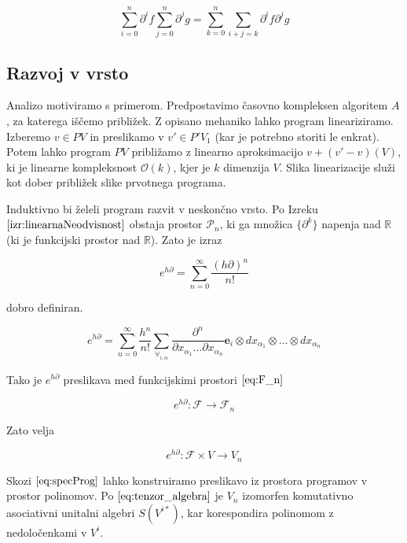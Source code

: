 \documentclass{article}
\newcommand{\RR}{\mathbb{R}}
\newcommand{\e}{\mathbf{e}}
\newcommand{\F}{\mathcal{F}}
\newcommand{\dP}{\mathcal{P}}
\newcommand{\D}{\partial}
\begin{document}
\begin{equation}\label{eq:P_prod}
	\sum\limits_{i=0}^{n}\D^if\sum\limits_{j=0}^{n}\D^jg=\sum\limits_{k=0}^{n}\sum\limits_{i+j=k}\D^if\D^jg
\end{equation}

 \subsection{Razvoj v vrsto}
  
  Analizo motiviramo s primerom. Predpostavimo časovno kompleksen algoritem $A$, za katerega iščemo približek. Z opisano mehaniko lahko program lineariziramo.
  Izberemo $v\in PV$ in preslikamo v $v'\in P'V_1$ (kar je potrebno storiti le enkrat). Potem lahko program $PV$ približamo z linearno aproksimacijo $v+(v'-v) (V)$, ki je linearne kompleksnost $\mathcal{O}(k)$, kjer je $k$ dimenzija $V$.
  Slika linearizacije služi kot dober približek slike prvotnega programa.
  
  Induktivno bi želeli program razvit v neskončno vrsto. Po Izreku $\ref{izr:linearnaNeodvisnost}$  obstaja prostor $\dP_n$, ki ga množica $\{\D^k\}$ napenja nad $\RR$ (ki je funkcijski prostor nad $\RR$). Zato je izraz
  
  
 \begin{equation}
 	e^{h\D}=\sum\limits_{n=0}^{\infty}\frac{(h\D)^n}{n!}
 \end{equation}
 
 dobro definiran.
 
 \begin{equation}\label{eq:e^d}
 	e^{h\D}=\sum\limits_{n=0}^{\infty}\frac{h^n}{n!}\sum_{\forall_{i,\alpha}}\frac{\partial^n}{\partial
 		    x_{\alpha_1}\ldots \partial x_{\alpha_n}}\e_i\otimes
 		  dx_{\alpha_1}\otimes\ldots \otimes dx_{\alpha_n}
 \end{equation}
 
 Tako je $e^{h\D}$ preslikava med funkcijskimi prostori $\eqref{eq:F_n}$
 
 \begin{equation}
 	e^{h\D}:\F\to\F_n
 \end{equation}
 
 Zato velja
  
  \begin{equation}\label{eq:specProg}
  	e^{h\D}:\F\times V\to V_n
  \end{equation}
  
 
Skozi $\eqref{eq:specProg}$ lahko konstruiramo preslikavo iz prostora programov v prostor polinomov.  Po $\eqref{eq:tenzor_algebra}$ je $V_n$ izomorfen komutativno asociativni unitalni algebri $S(V^{i*})$, kar korespondira polinomom z nedoločenkami v $V^i$.
 
\end{document}
